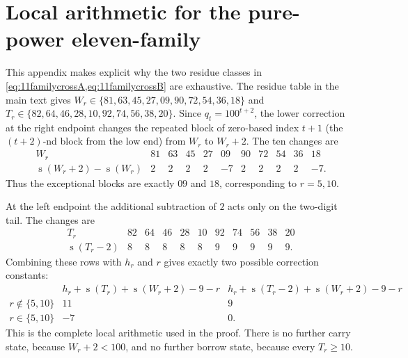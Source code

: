 \documentclass[11pt]{article}
\newcommand{\ds}{\operatorname{s}}
\begin{document}
\section{Local arithmetic for the pure-power eleven-family}\label{app:11transfer}
This appendix makes explicit why the two residue classes in \cref{eq:11familycrossA,eq:11familycrossB} are exhaustive.  The residue table in the main text gives $W_r\in\{81,63,45,27,09,90,72,54,36,18\}$ and $T_r\in\{82,64,46,28,10,92,74,56,38,20\}$.  Since $q_t=100^{t+2}$, the lower correction at the right endpoint changes the repeated block of zero-based index $t+1$ (the $(t+2)$-nd block from the low end) from $W_r$ to $W_r+2$.  The ten changes are
\[
\begin{array}{c|cccccccccc}
W_r&81&63&45&27&09&90&72&54&36&18\\ \hline
\ds(W_r+2)-\ds(W_r)&2&2&2&2&-7&2&2&2&2&-7.
\end{array}
\]
Thus the exceptional blocks are exactly $09$ and $18$, corresponding to $r=5,10$.

At the left endpoint the additional subtraction of $2$ acts only on the two-digit tail.  The changes are
\[
\begin{array}{c|cccccccccc}
T_r&82&64&46&28&10&92&74&56&38&20\\ \hline
\ds(T_r-2)&8&8&8&8&8&9&9&9&9&9.
\end{array}
\]
Combining these rows with $h_r$ and $r$ gives exactly two possible correction constants:
\[
\begin{array}{c|cc}
 & h_r+\ds(T_r)+\ds(W_r+2)-9-r
 & h_r+\ds(T_r-2)+\ds(W_r+2)-9-r\\ \hline
r\notin\{5,10\}&11&9\\
r\in\{5,10\}&-7&0.
\end{array}
\]
This is the complete local arithmetic used in the proof.  There is no further carry state, because $W_r+2<100$, and no further borrow state, because every $T_r\ge10$.

\clearpage
\end{document}
